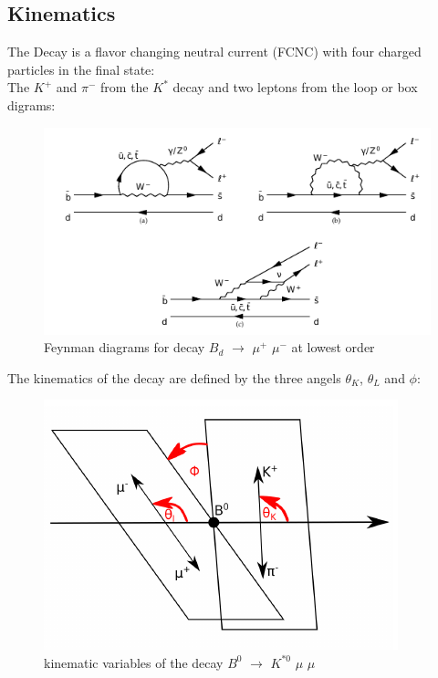 \documentclass[english]{uzhpub}
\begin{document}
\subsection{Kinematics}
The Decay is a flavor changing neutral current (FCNC) with four charged particles in the final state: \\
The $K^+$ and $\pi^-$ from the $K^{*}$ decay and two leptons from the loop or box digrams:
\begin{figure}[H]
  \centering
  \includegraphics[width=0.8\linewidth]{KstarFeynman}
  \caption{Feynman diagrams for decay $B_d$ $\rightarrow$ $\mu^+$ $\mu^-$ at lowest order}
  \label{fig:Feynman}
\end{figure}
The kinematics of the decay are defined by the three angels $\theta_K$, $\theta_L$ and $\phi$:
\begin{figure}[H]
  \centering
  \includegraphics[width=0.6\linewidth]{angels}
  \caption{kinematic variables of the decay $B^0$ $\rightarrow$ $K^{*0}$ $\mu$ $\mu$}
  \label{fig:angels}
\end{figure}
\end{document}
